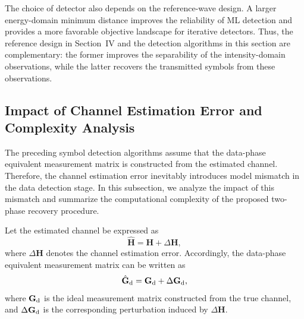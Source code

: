\documentclass[journal]{IEEEtran}
\begin{document}
The choice of detector also depends on the reference-wave design. 
A larger energy-domain minimum distance improves the reliability of ML detection and provides a more favorable objective landscape for iterative detectors. 
Thus, the reference design in Section~IV and the detection algorithms in this section are complementary: the former improves the separability of the intensity-domain observations, while the latter recovers the transmitted symbols from these observations.


\subsection{Impact of Channel Estimation Error and Complexity Analysis}

The preceding symbol detection algorithms assume that the data-phase equivalent measurement matrix is constructed from the estimated channel. 
Therefore, the channel estimation error inevitably introduces model mismatch in the data detection stage. 
In this subsection, we analyze the impact of this mismatch and summarize the computational complexity of the proposed two-phase recovery procedure.

Let the estimated channel be expressed as
\begin{equation}
\hat{\mathbf{H}}
=
\mathbf{H}
+
\Delta\mathbf{H},
\label{eq:channel_estimation_error}
\end{equation}
where $\Delta\mathbf{H}$ denotes the channel estimation error. 
Accordingly, the data-phase equivalent measurement matrix can be written as
\begin{equation}
\hat{\mathbf{G}}_{\rm d}
=
\mathbf{G}_{\rm d}
+
\Delta\mathbf{G}_{\rm d},
\label{eq:Gd_estimation_error}
\end{equation}
where $\mathbf{G}_{\rm d}$ is the ideal measurement matrix constructed from the true channel, and $\Delta\mathbf{G}_{\rm d}$ is the corresponding perturbation induced by $\Delta\mathbf{H}$.
\end{document}
